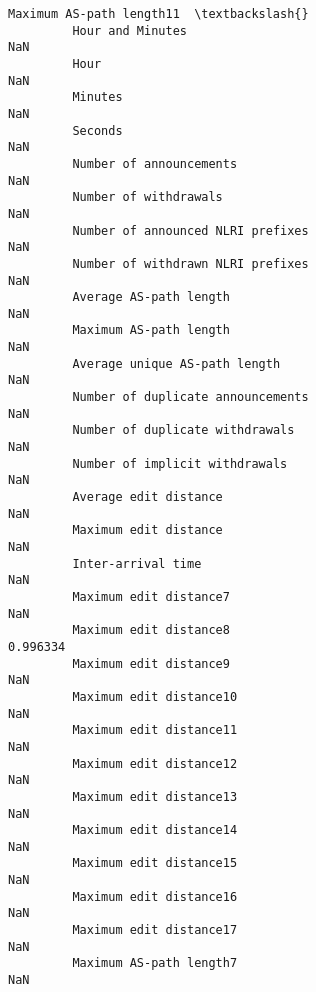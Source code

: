 \documentclass[11pt]{article}
\begin{document}
\begin{Verbatim}[commandchars=\\\{\}]
                                                            Maximum AS-path length11  \textbackslash{}
         Hour and Minutes                                                        NaN   
         Hour                                                                    NaN   
         Minutes                                                                 NaN   
         Seconds                                                                 NaN   
         Number of announcements                                                 NaN   
         Number of withdrawals                                                   NaN   
         Number of announced NLRI prefixes                                       NaN   
         Number of withdrawn NLRI prefixes                                       NaN   
         Average AS-path length                                                  NaN   
         Maximum AS-path length                                                  NaN   
         Average unique AS-path length                                           NaN   
         Number of duplicate announcements                                       NaN   
         Number of duplicate withdrawals                                         NaN   
         Number of implicit withdrawals                                          NaN   
         Average edit distance                                                   NaN   
         Maximum edit distance                                                   NaN   
         Inter-arrival time                                                      NaN   
         Maximum edit distance7                                                  NaN   
         Maximum edit distance8                                             0.996334   
         Maximum edit distance9                                                  NaN   
         Maximum edit distance10                                                 NaN   
         Maximum edit distance11                                                 NaN   
         Maximum edit distance12                                                 NaN   
         Maximum edit distance13                                                 NaN   
         Maximum edit distance14                                                 NaN   
         Maximum edit distance15                                                 NaN   
         Maximum edit distance16                                                 NaN   
         Maximum edit distance17                                                 NaN   
         Maximum AS-path length7                                                 NaN   

\end{Verbatim}
\end{document}
